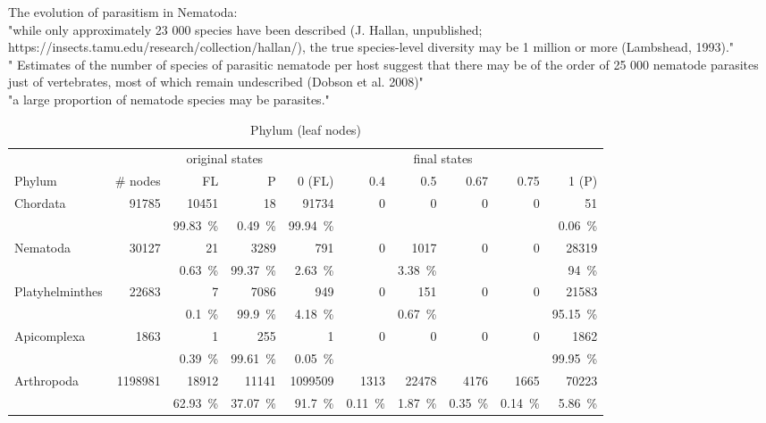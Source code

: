         The evolution of parasitism in Nematoda: \\
        "while only approximately 23 000 species have been described (J. Hallan, unpublished; https://insects.tamu.edu/research/collection/hallan/), the true species-level diversity may be 1 million or more (Lambshead, 1993)." \\
        " Estimates of the number of species of parasitic nematode per host suggest that there may be of the order of 25 000 nematode parasites just of vertebrates, most of which remain undescribed (Dobson et al. 2008)" \\
        "a large proportion of nematode species may be parasites." \cite{Blaxter2015} \\

      \begin{table}
        \begin{center}
          \hspace*{-1cm}\begin{tabular}{ |l|r||r|r||r|r|r|r|r|r| }
            \hline
            & & \multicolumn{2}{c||}{original states} & \multicolumn{6}{c|}{final states} \\
            Phylum & \# nodes & FL & P
              & 0 (FL) & 0.4 & 0.5 & 0.67 & 0.75 & 1 (P) \\
            \hline \hline
            Chordata & 91785 & 10451 & 18 
              & 91734 & 0 & 0 & 0 & 0 & 51 \\
            & & 99.83~\% & 0.49~\%
              & 99.94~\% & & & & & 0.06~\% \\ \hline
            Nematoda & 30127 & 21 & 3289 
              & 791 & 0 & 1017 & 0 & 0 & 28319 \\
            & & 0.63~\% & 99.37~\%
              & 2.63~\% & & 3.38~\% & & & 94~\% \\ \hline
            Platyhelminthes & 22683 & 7 & 7086 
              & 949 & 0 & 151 & 0 & 0 & 21583 \\
            & & 0.1~\% & 99.9~\%
              & 4.18~\% & & 0.67~\% & & & 95.15~\% \\ \hline
            Apicomplexa & 1863 & 1 & 255 
              & 1 & 0 & 0 & 0 & 0 & 1862 \\
            & & 0.39~\% & 99.61~\%
              & 0.05~\% & & & & & 99.95~\% \\
            \hline \hline
            Arthropoda & 1198981 & 18912 & 11141 
              & 1099509 & 1313 & 22478 & 4176 & 1665 & 70223 \\
            & & 62.93~\% & 37.07~\%
              & 91.7~\% & 0.11~\% & 1.87~\% & 0.35~\% & 0.14~\% & 5.86~\% \\
            \hline
          \end{tabular} 
        \end{center}
        \caption{Phylum (leaf nodes)}
        \label{table:phylum leaf nodes states} 
      \end{table}

